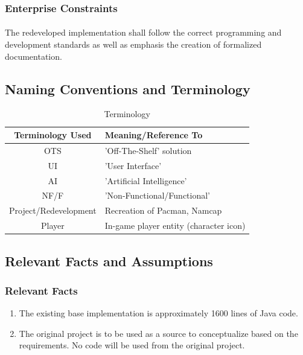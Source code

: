 \documentclass[12pt, titlepage]{article}
\begin{document}
\subsubsection{Enterprise Constraints}
\paragraph{}
The redeveloped implementation shall follow the correct programming and development standards as well as emphasis the creation of formalized documentation.

\subsection{Naming Conventions and Terminology}
\begin{table}[H]
\caption{Terminology} \label{tab:terms}
\begin{center}
\begin{tabular}{| c | l |}
\hline
\textbf{Terminology Used} & \textbf{Meaning/Reference To} \\ \hline
OTS & 'Off-The-Shelf' solution \\ \hline
UI & 'User Interface' \\ \hline
AI & 'Artificial Intelligence' \\ \hline
NF/F & 'Non-Functional/Functional' \\ \hline
Project/Redevelopment & Recreation of Pacman, Namcap \\ \hline
Player & In-game player entity (character icon)\\
\hline
\end{tabular}
\end{center}
\end{table}

\subsection{Relevant Facts and Assumptions}

\subsubsection{Relevant Facts}
\begin{enumerate}[i]
\item The existing base implementation is approximately 1600 lines of Java code.
\item The original project is to be used as a source to conceptualize based on the requirements. No code will be used from the original project.
\end{enumerate}
\end{document}
